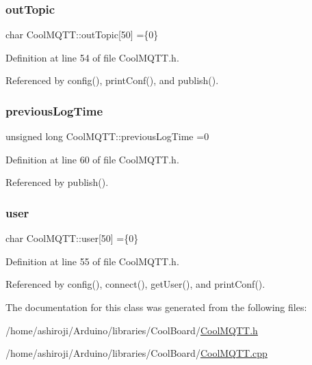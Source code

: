 \subsubsection{\texorpdfstring{out\+Topic}{outTopic}}
{\footnotesize\ttfamily char Cool\+M\+Q\+T\+T\+::out\+Topic\mbox{[}50\mbox{]} =\{\textquotesingle{}0\textquotesingle{}\}\hspace{0.3cm}{\ttfamily [private]}}



Definition at line 54 of file Cool\+M\+Q\+T\+T.\+h.



Referenced by config(), print\+Conf(), and publish().

\mbox{\label{classCoolMQTT_a3db37ef9ed3b05b2a8d44edba0e7d3cc}} 
\subsubsection{\texorpdfstring{previous\+Log\+Time}{previousLogTime}}
{\footnotesize\ttfamily unsigned long Cool\+M\+Q\+T\+T\+::previous\+Log\+Time =0\hspace{0.3cm}{\ttfamily [private]}}



Definition at line 60 of file Cool\+M\+Q\+T\+T.\+h.



Referenced by publish().

\mbox{\label{classCoolMQTT_a8cd47e45d457f908d4b4390b35aaee83}} 
\subsubsection{\texorpdfstring{user}{user}}
{\footnotesize\ttfamily char Cool\+M\+Q\+T\+T\+::user\mbox{[}50\mbox{]} =\{\textquotesingle{}0\textquotesingle{}\}\hspace{0.3cm}{\ttfamily [private]}}



Definition at line 55 of file Cool\+M\+Q\+T\+T.\+h.



Referenced by config(), connect(), get\+User(), and print\+Conf().



The documentation for this class was generated from the following files\+:\begin{DoxyCompactItemize}
\item 
/home/ashiroji/\+Arduino/libraries/\+Cool\+Board/\hyperlink{CoolMQTT_8h}{Cool\+M\+Q\+T\+T.\+h}\item 
/home/ashiroji/\+Arduino/libraries/\+Cool\+Board/\hyperlink{CoolMQTT_8cpp}{Cool\+M\+Q\+T\+T.\+cpp}\end{DoxyCompactItemize}
